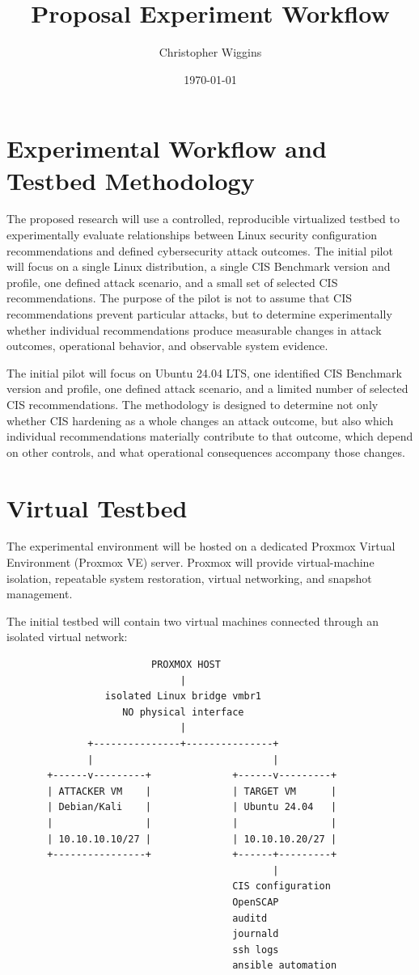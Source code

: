 \documentclass[11pt]{article}
\author{Christopher Wiggins}
\date{\today}
\title{Proposal Experiment Workflow}
\begin{document}
\maketitle
\clearpage
\section{Experimental Workflow and Testbed Methodology}
\label{sec:orgeada986}

The proposed research will use a controlled, reproducible virtualized
testbed to experimentally evaluate relationships between Linux security
configuration recommendations and defined cybersecurity attack outcomes.
The initial pilot will focus on a single Linux distribution, a single
CIS Benchmark version and profile, one defined attack scenario, and a
small set of selected CIS recommendations. The purpose of the pilot is
not to assume that CIS recommendations prevent particular attacks, but
to determine experimentally whether individual recommendations produce
measurable changes in attack outcomes, operational behavior, and
observable system evidence.

The initial pilot will focus on Ubuntu 24.04 LTS, one identified CIS
Benchmark version and profile, one defined attack scenario, and a
limited number of selected CIS recommendations. The methodology is
designed to determine not only whether CIS hardening as a whole changes
an attack outcome, but also which individual recommendations materially
contribute to that outcome, which depend on other controls, and what
operational consequences accompany those changes.
\section{Virtual Testbed}
\label{sec:org4202cea}
The experimental environment will be hosted on a dedicated Proxmox
Virtual Environment (Proxmox VE) server. Proxmox will provide
virtual-machine isolation, repeatable system restoration, virtual
networking, and snapshot management.

The initial testbed will contain two virtual machines connected through
an isolated virtual network:

\begin{verbatim}
                         PROXMOX HOST
                              |
                 isolated Linux bridge vmbr1
                    NO physical interface
                              |
              +---------------+---------------+
              |                               |
       +------v---------+              +------v---------+
       | ATTACKER VM    |              | TARGET VM      |
       | Debian/Kali    |              | Ubuntu 24.04   |
       |                |              |                |
       | 10.10.10.10/27 |              | 10.10.10.20/27 |
       +----------------+              +------+---------+
                                              |
                                       CIS configuration
                                       OpenSCAP
                                       auditd
                                       journald
                                       ssh logs
                                       ansible automation
\end{verbatim}
\end{document}
